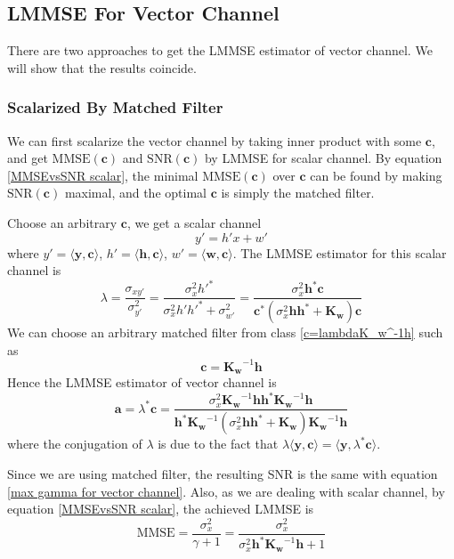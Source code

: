 \documentclass[12pt]{article}
\theoremstyle{definition}
\begin{document}
\subsection{LMMSE For Vector Channel}
There are two approaches to get the LMMSE estimator of vector channel. We will show that the results coincide.
\subsubsection{Scalarized By Matched Filter}
We can first scalarize the vector channel by taking inner product with some $\bm{c}$, and get $\mbox{MMSE}(\bm{c})$ and $\mbox{SNR}(\bm{c})$ by LMMSE for scalar channel. By equation \ref{MMSEvsSNR scalar}, the minimal $\mbox{MMSE}(\bm{c})$ over $\bm{c}$ can be found by making $\mbox{SNR}(\bm{c})$ maximal, and the optimal $\bm{c}$ is simply the matched filter.

Choose an arbitrary $\bm{c}$, we get a scalar channel
$$y'=h'x+w'$$
where $y'=\langle \bm{y},\bm{c}\rangle$, $h'=\langle \bm{h},\bm{c}\rangle$, $w'=\langle \bm{w},\bm{c}\rangle$. The LMMSE estimator for this scalar channel is
$$\lambda =\frac{\sigma_{xy'}}{\sigma_{y'}^2}= \frac{\sigma_x^2{h'}^*}{\sigma_x^2h'{h'}^*+\sigma_{w'}^2}=\frac{\sigma_x^2\bm{h}^*\bm{c}}{\bm{c}^*(\sigma_x^2\bm{h}\bm{h}^*+\bm{K_w})\bm{c}}$$
We can choose an arbitrary matched filter from class \ref{c=lambdaK_w^-1h} such as 
$$\bm{c}=\bm{K_w}^{-1}\bm{h}$$
Hence the LMMSE estimator of vector channel is
\begin{equation}
	\bm{a}=\lambda^*\bm{c}=\frac{\sigma_x^2\bm{K_w}^{-1}\bm{h}\bm{h}^*\bm{K_w}^{-1}\bm{h}}{\bm{h}^*\bm{K_w}^{-1}\left(\sigma_x^2\bm{h}\bm{h}^*+\bm{K_w}\right)\bm{K_w}^{-1}\bm{h}}\label{a=lambda*c}
\end{equation}
where the conjugation of $\lambda$ is due to the fact that $\lambda\langle \bm{y},\bm{c}\rangle=\langle \bm{y},\lambda^*\bm{c}\rangle$.

Since we are using matched filter, the resulting SNR is the same with equation \ref{max gamma for vector channel}. Also, as we are dealing with scalar channel, by equation \ref{MMSEvsSNR scalar}, the achieved LMMSE is
$$\mbox{MMSE}=\frac{\sigma_x^2}{\gamma+1}=\frac{\sigma_x^2}{\sigma_x^2\bm{h}^*\bm{K_w}^{-1}\bm{h}+1}$$
\end{document}
